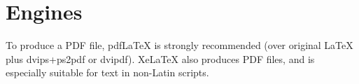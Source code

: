 \documentclass[11pt]{article}
\begin{document}
% 




        
    


\section{Engines}

To produce a PDF file, pdf\LaTeX{} is strongly recommended (over original \LaTeX{} plus dvips+ps2pdf or dvipdf). Xe\LaTeX{} also produces PDF files, and is especially suitable for text in non-Latin scripts.

\end{document}
